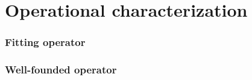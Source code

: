 \part{Operational characterization}


\section{Fitting operator}

\section{Well-founded operator}

%
